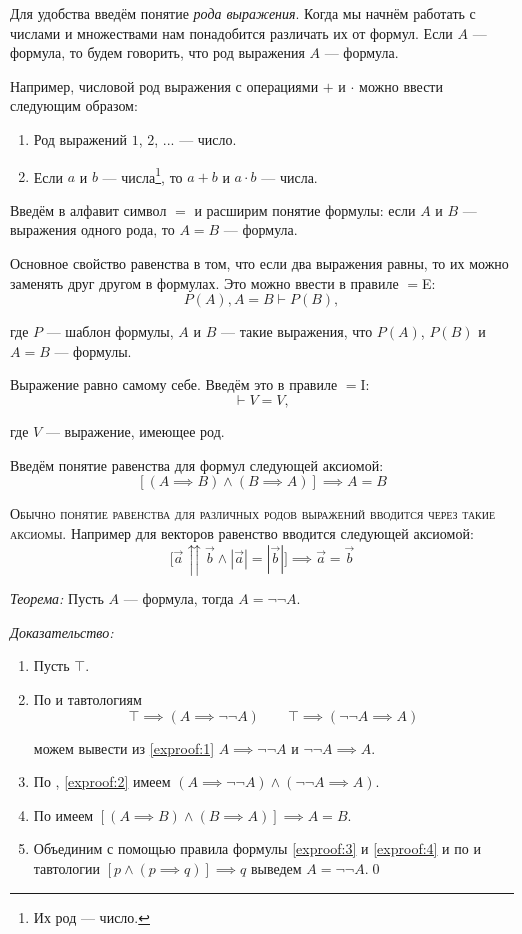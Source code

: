 Для удобства введём понятие {\it рода выражения}. Когда мы начнём работать с числами
и множествами нам понадобится различать их от формул. Если $A$ --- формула,
то будем говорить, что род выражения $A$ --- формула.

Например, числовой род выражения с операциями $+$ и $\cdot$
можно ввести следующим образом:
\begin{enumerate}
	\item{}Род выражений $1$, $2$, ... --- число.
	\item{}Если $a$ и $b$ --- числа\footnote{Их род --- число.}, то
	$a+b$ и $a\cdot b$ --- числа.
\end{enumerate}

Введём в алфавит символ $=$ и расширим понятие формулы: если $A$ и $B$ --- выражения
одного рода, то $A=B$ --- формула.

Основное свойство равенства в том, что если два выражения равны, то их можно
заменять друг другом в формулах. Это можно ввести в правиле $=$E:
\[
	P(A),A=B\vdash P(B),
\]

где $P$ --- шаблон формулы, $A$ и $B$ --- такие выражения, что
$P(A)$, $P(B)$ и $A=B$ --- формулы.

Выражение равно самому себе. Введём это в правиле $=$I:
\[
	\vdash V=V,
\]

где $V$ --- выражение, имеющее род.

Введём понятие равенства для формул следующей аксиомой:
\[
	[(A\implies B)\land (B\implies A)]\implies A=B
\]

\textsc{Обычно понятие равенства для различных родов выражений
	вводится через такие аксиомы.}
Например для векторов равенство вводится следующей аксиомой:
\[
	\big[\vec{a}\upuparrows\vec{b}\land|\vec{a}|=|\vec{b}|\big]
	\implies \vec{a}=\vec{b}
\]

{\it Теорема:} Пусть $A$ --- формула, тогда $A=\lnot\lnot A$.

	{\it Доказательство:}
\begin{enumerate}[label=(\arabic*)]
	\item{}Пусть $\top$.\label{exproof:1}

	\item{}По \taut{} и тавтологиям
	\[
		\top\implies (A\implies \lnot\lnot A)\qquad
		\top\implies (\lnot\lnot A\implies A)
	\]

	можем вывести из \ref{exproof:1} $A\implies\lnot\lnot A$ и $\lnot\lnot A\implies A$.
	\label{exproof:2}

	\item{}По \conj{}, \ref{exproof:2} имеем
	$(A\implies\lnot\lnot A)\land(\lnot\lnot A\implies A)$.\label{exproof:3}

	\item{}По \axiom{} имеем $[(A\implies B)\land (B\implies A)]\implies A=B$.
	\label{exproof:4}

	\item{}Объединим с помощью правила \conj{} формулы
	\ref{exproof:3} и \ref{exproof:4} и по \taut{} и тавтологии
	$[p\land (p\implies q)]\implies q$ выведем $A=\lnot\lnot A$.\qed
\end{enumerate}

